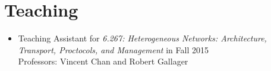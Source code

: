 \documentclass[letterpaper,12pt]{article}
\begin{document}
\section{Teaching}

\begin{itemize}

\item Teaching Assistant for \emph{6.267: Heterogeneous Networks: Architecture, Transport, Proctocols, and Management} in Fall 2015\\
Professors: Vincent Chan and Robert Gallager

\end{itemize}
\newpage


\end{document}
